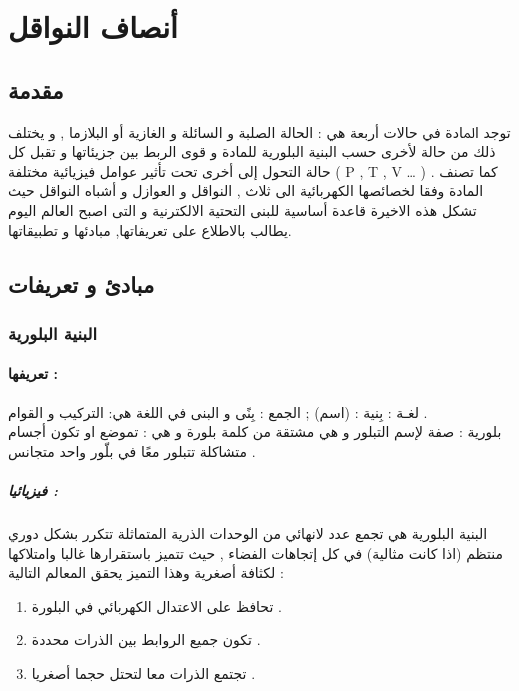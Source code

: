 
\chapter{ أنصاف النواقل }

\label{Chapter1}
\section*{مقدمة}

‫ﺗﻮﺟﺪ ‫اﳌﺎدة‬  ‬في  ‫ﺣﺎﻻت‬ ‫أرﺑﻌﺔ‬ هي : الحالة الصلبة و السائلة و الغازية أو البلازما , و يختلف ذلك من حالة لأخرى حسب البنية البلورية للمادة و قوى الربط بين جزيئاتها و تقبل كل حالة التحول  إلى أخرى تحت تأثير عوامل فيزيائية مختلفة ( P , T , V … ) .
كما تصنف المادة وفقا لخصائصها الكهربائية الى ثلاث , النواقل و العوازل و أشباه النواقل حيث تشكل هذه الاخيرة قاعدة أساسية للبنى التحتية الالكترنية و التى اصبح العالم اليوم يطالب بالاطلاع على  تعريفاتها, مبادئها و تطبيقاتها\cite{a1}.

\section{مبادئ و تعريفات}

\subsection{البنية البلورية }

\subsubsection{تعريفها :}
لغـة : بِنية : (اسم) ; الجمع : بِنًى و البنى في اللغة هي: التركيب و القوام . \\
بلورية : صفة لإسم التبلور و هي مشتقة من كلمة بلورة و هي : تموضع او تكون أجسام متشاكلة تتبلور معًا في بلّور واحد متجانس .

\paragraph{فيزيائيا :}

البنیة البلوریة هي تجمع عدد لانهائي من الوحدات الذرية المتماثلة تتكرر بشكل دوري منتظم (اذا كانت مثالية) في كل إتجاهات الفضاء , حيث تتميز باستقرارها غالبا وامتلاكها لكثافة أصغرية وهذا التميز يحقق المعالم التالية :
\begin{enumerate}
	\item
	تحافظ على الاعتدال الكهربائي في البلورة .
	\item
	تكون جميع الروابط بين الذرات محددة .
	\item
	تجتمع الذرات معا لتحتل حجما أصغريا . 
\end{enumerate}

